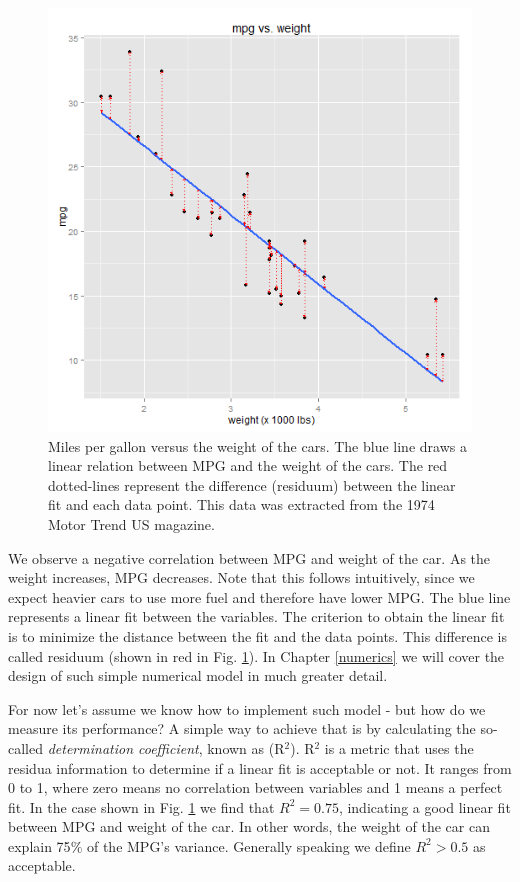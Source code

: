 \begin{figure}[h]
	\begin{center}
			\includegraphics[scale=0.35]{Parts/basics/linregch2}
	\end{center}
	\caption{Miles per gallon versus the weight of the cars. The blue line draws a linear relation between MPG and the weight of the cars. The red dotted-lines represent the difference (residuum) between the linear fit and each data point. This data was extracted from the 1974 Motor Trend US magazine.}
	\label{fig:linR}
\end{figure} 

We observe a negative correlation between MPG and weight of the car. As the weight increases, MPG decreases. Note that this follows intuitively, since we expect heavier cars to use more fuel and therefore have lower MPG. The blue line represents a linear fit between the variables. The criterion to obtain the linear fit is to minimize the distance between the fit and the data points. This difference is called residuum (shown in red in Fig. \ref{fig:linR}). In Chapter \ref{numerics} we will cover the design of such simple numerical model in much greater detail. 

\newpage

For now let's assume we know how to implement such model - but how do we measure its performance? A simple way to achieve that is by calculating the so-called \textit{determination coefficient}, known as (R$^2$). R$^2$ is a metric that uses the residua information to determine if a linear fit is acceptable or not. It ranges from 0 to 1, where zero means no correlation between variables and 1 means a perfect fit. In the case shown in Fig. \ref{fig:linR} we find that $R^2=0.75$, indicating a good linear fit between MPG and weight of the car. In other words, the weight of the car can explain 75$\%$ of the MPG's variance. Generally speaking we define $R^2>0.5$ as acceptable. 
 
